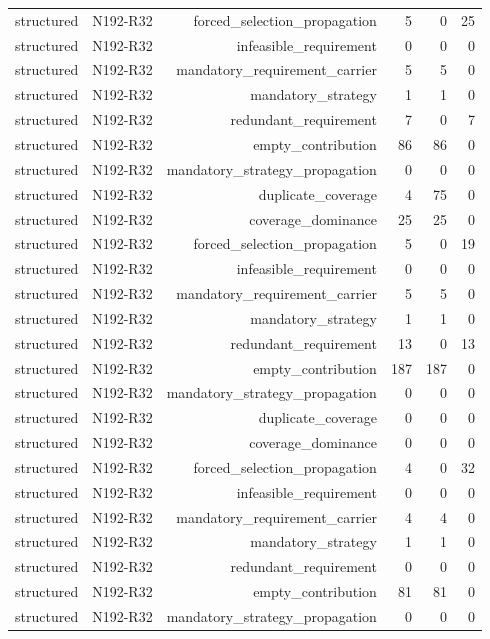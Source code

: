 {\begin{longtable}{lrrrrr}
structured & N192-R32 & forced\_selection\_propagation & 5 & 0 & 25 \\
structured & N192-R32 & infeasible\_requirement & 0 & 0 & 0 \\
structured & N192-R32 & mandatory\_requirement\_carrier & 5 & 5 & 0 \\
structured & N192-R32 & mandatory\_strategy & 1 & 1 & 0 \\
structured & N192-R32 & redundant\_requirement & 7 & 0 & 7 \\
structured & N192-R32 & empty\_contribution & 86 & 86 & 0 \\
structured & N192-R32 & mandatory\_strategy\_propagation & 0 & 0 & 0 \\
structured & N192-R32 & duplicate\_coverage & 4 & 75 & 0 \\
structured & N192-R32 & coverage\_dominance & 25 & 25 & 0 \\
structured & N192-R32 & forced\_selection\_propagation & 5 & 0 & 19 \\
structured & N192-R32 & infeasible\_requirement & 0 & 0 & 0 \\
structured & N192-R32 & mandatory\_requirement\_carrier & 5 & 5 & 0 \\
structured & N192-R32 & mandatory\_strategy & 1 & 1 & 0 \\
structured & N192-R32 & redundant\_requirement & 13 & 0 & 13 \\
structured & N192-R32 & empty\_contribution & 187 & 187 & 0 \\
structured & N192-R32 & mandatory\_strategy\_propagation & 0 & 0 & 0 \\
structured & N192-R32 & duplicate\_coverage & 0 & 0 & 0 \\
structured & N192-R32 & coverage\_dominance & 0 & 0 & 0 \\
structured & N192-R32 & forced\_selection\_propagation & 4 & 0 & 32 \\
structured & N192-R32 & infeasible\_requirement & 0 & 0 & 0 \\
structured & N192-R32 & mandatory\_requirement\_carrier & 4 & 4 & 0 \\
structured & N192-R32 & mandatory\_strategy & 1 & 1 & 0 \\
structured & N192-R32 & redundant\_requirement & 0 & 0 & 0 \\
structured & N192-R32 & empty\_contribution & 81 & 81 & 0 \\
structured & N192-R32 & mandatory\_strategy\_propagation & 0 & 0 & 0 \\

\end{longtable}}
